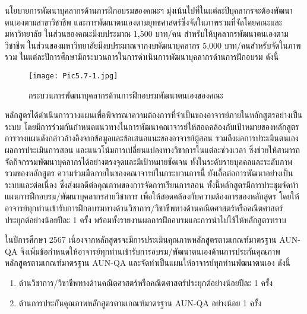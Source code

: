 นโยบายการพัฒนาบุคลากรด้านการฝึกอบรมของคณะฯ มุ่งเน้นไปที่ในแต่ละปีบุคลากรจะต้องพัฒนาตนเองตามสาขาวิชาชีพ และการพัฒนาตนเองตามยุทธศาสตร์ซึ่งจัดในภาพรวมที่จัดโดยคณะและมหาวิทยาลัย ในส่วนของคณะมีงบประมาณ 1,500 บาท/คน สำหรับให้บุคลากรพัฒนาตนเองตามวิชาชีพ ในส่วนของมหาวิทยาลัยมีงบประมาณจากงบพัฒนาบุคลากร 5,000 บาท/คนสำหรับจัดในภาพรวม ในแต่ละปีการศึกษามีกระบวนการในการดำเนินการพัฒนาบุคลากรด้านการฝึกอบรม  ดังนี้

\begin{figure}[h!]
	\begin{center}
	\texttt{[image: Pic5.7-1.jpg]}
	\caption{กระบวนการพัฒนาบุคลากรด้านการฝึกอบรมพัฒนาตนเองของคณะ}
	\label{Pic5.7-1}
	\end{center}
\end{figure}
\newpage
หลักสูตรได้ดำเนินการวางแผนเพื่อพิจารณาความต้องการที่จำเป็นของอาจารย์ภายในหลักสูตรอย่างเป็นระบบ โดยมีการร่วมกันกำหนดแนวทางในการพัฒนาคณาจารย์ให้สอดคล้องกับเป้าหมายของหลักสูตร การวางแผนดังกล่าวอ้างอิงจากข้อมูลและข้อเสนอแนะของอาจารย์ผู้สอน รวมถึงผลการประเมินตนเอง ผลการประเมินการสอน และแนวโน้มการเปลี่ยนแปลงทางวิชาการในแต่ละช่วงเวลา ซึ่งช่วยให้สามารถจัดกิจกรรมพัฒนาบุคลากรได้อย่างตรงจุดและมีเป้าหมายชัดเจน ทั้งในระดับรายบุคคลและระดับภาพรวมของหลักสูตร ความร่วมมือภายในของคณาจารย์ในกระบวนการนี้ ยังเอื้อต่อการพัฒนาอย่างเป็นระบบและต่อเนื่อง ซึ่งส่งผลดีต่อคุณภาพของการจัดการเรียนการสอน 
ทั้งนี้หลักสูตรมีการประชุมจัดทำแผนการฝึกอบรม/พัฒนาบุคลากรสายวิชาการ เพื่อให้สอดคล้องกับความต้องการของหลักสูตร โดยให้อาจารย์ทุกท่านเข้ารับการฝึกอบรมทางด้านวิชาการ/วิชาชีพทางด้านคณิตศาสตร์หรือคณิตศาสตร์ประยุกต์อย่างน้อยปีละ 1 ครั้ง พร้อมทั้งรายงานผลการฝึกอบรมและการนำไปใช้ให้หลักสูตรทราบ


ในปีการศึกษา 2567  เนื่องจากหลักสูตรจะมีการประเมินคุณภาพหลักสูตรตามเกณฑ์มาตรฐาน AUN-QA จึงเพิ่มข้อกำหนดให้อาจารย์ทุกท่านเข้ารับการอบรม/พัฒนาตนเองด้านการประกันคุณภาพหลักสูตรตามเกณฑ์มาตรฐาน AUN-QA และจัดทำเป็นแผนให้อาจารย์ทุกท่านพัฒนาตนเอง ดังนี้
\begin{enumerate}
	\item ด้านวิชาการ/วิชาชีพทางด้านคณิตศาสตร์หรือคณิตศาสตร์ประยุกต์อย่างน้อยปีละ 1 ครั้ง
	\item ด้านการประกันคุณภาพหลักสูตรตามเกณฑ์มาตรฐาน AUN-QA อย่างน้อย 1 ครั้ง
\end{enumerate}

